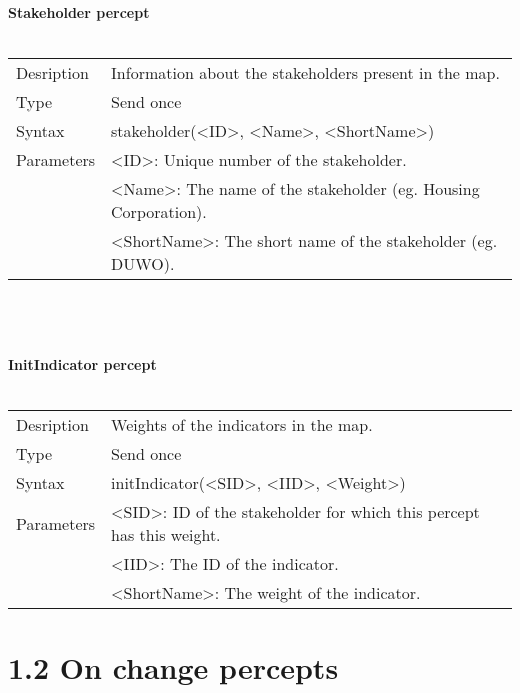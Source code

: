 \documentclass[english,11pt]{report}
\begin{document}
\textbf{Stakeholder percept}\\
\\
\begin{tabularx}{\textwidth}{lX}
 Desription & Information about the stakeholders present in the map. \\
 Type & Send once \\
 Syntax & stakeholder(<ID>, <Name>, <ShortName>) \\
 Parameters &   <ID>: Unique number of the stakeholder.\\
            &   <Name>: The name of the stakeholder (eg. Housing Corporation).\\
            &   <ShortName>: The short name of the stakeholder (eg. DUWO).
\end{tabularx}\\
\\
\\
\textbf{InitIndicator percept}\\
\\
\begin{tabularx}{\textwidth}{lX}
 Desription & Weights of the indicators in the map. \\
 Type & Send once \\
 Syntax & initIndicator(<SID>, <IID>, <Weight>) \\
 Parameters &   <SID>: ID of the stakeholder for which this percept has this weight.\\
            &   <IID>: The ID of the indicator.\\
            &   <ShortName>: The weight of the indicator.
\end{tabularx}

\newpage
\section*{1.2 On change percepts}
\end{document}
